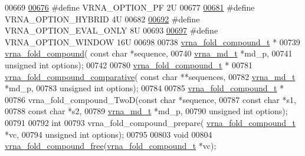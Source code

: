 \begin{DoxyCode}
00669 
\hypertarget{data__structures_8h_source.tex_l00676}{}\hyperlink{group__fold__compound_gabfbadcddda3e74ce7f49035ef8f058f7}{00676} \textcolor{preprocessor}{#define VRNA\_OPTION\_PF              2U}
00677 
\hypertarget{data__structures_8h_source.tex_l00681}{}\hyperlink{group__fold__compound_ga8f681fa12b8d4b348bf58415fd1fc82f}{00681} \textcolor{preprocessor}{#define VRNA\_OPTION\_HYBRID          4U}
00682 
\hypertarget{data__structures_8h_source.tex_l00692}{}\hyperlink{group__fold__compound_ga61469c423131552c8483229f8b6c7e0e}{00692} \textcolor{preprocessor}{#define VRNA\_OPTION\_EVAL\_ONLY       8U}
00693 
\hypertarget{data__structures_8h_source.tex_l00697}{}\hyperlink{group__fold__compound_ga2b2a8009ccdccc3eb1571556261aee8e}{00697} \textcolor{preprocessor}{#define VRNA\_OPTION\_WINDOW          16U}
00698 
00738 \hyperlink{group__fold__compound_structvrna__fc__s}{vrna\_fold\_compound\_t} *
00739 \hyperlink{group__fold__compound_ga6601d994ba32b11511b36f68b08403be}{vrna\_fold\_compound}( \textcolor{keyword}{const} \textcolor{keywordtype}{char} *sequence,
00740                     \hyperlink{structvrna__md__s}{vrna\_md\_t} *md\_p,
00741                     \textcolor{keywordtype}{unsigned} \textcolor{keywordtype}{int} options);
00742 
00780 \hyperlink{group__fold__compound_structvrna__fc__s}{vrna\_fold\_compound\_t} *
00781 \hyperlink{group__fold__compound_gad6bacc816af274922b13d947f708aa0c}{vrna\_fold\_compound\_comparative}( \textcolor{keyword}{const} \textcolor{keywordtype}{char} **sequences,
00782                                 \hyperlink{structvrna__md__s}{vrna\_md\_t} *md\_p,
00783                                 \textcolor{keywordtype}{unsigned} \textcolor{keywordtype}{int} options);
00784 
00785 \hyperlink{group__fold__compound_structvrna__fc__s}{vrna\_fold\_compound\_t} *
00786 vrna\_fold\_compound\_TwoD(\textcolor{keyword}{const} \textcolor{keywordtype}{char} *sequence,
00787                         \textcolor{keyword}{const} \textcolor{keywordtype}{char} *s1,
00788                         \textcolor{keyword}{const} \textcolor{keywordtype}{char} *s2,
00789                         \hyperlink{structvrna__md__s}{vrna\_md\_t} *md\_p,
00790                         \textcolor{keywordtype}{unsigned} \textcolor{keywordtype}{int} options);
00791 
00792 \textcolor{keywordtype}{int}
00793 vrna\_fold\_compound\_prepare( \hyperlink{group__fold__compound_structvrna__fc__s}{vrna\_fold\_compound\_t} *vc,
00794                             \textcolor{keywordtype}{unsigned} \textcolor{keywordtype}{int} options);
00795 
00803 \textcolor{keywordtype}{void}
00804 \hyperlink{group__fold__compound_gadded6039d63f5d6509836e20321534ad}{vrna\_fold\_compound\_free}(\hyperlink{group__fold__compound_structvrna__fc__s}{vrna\_fold\_compound\_t} *vc);

\end{DoxyCode}
